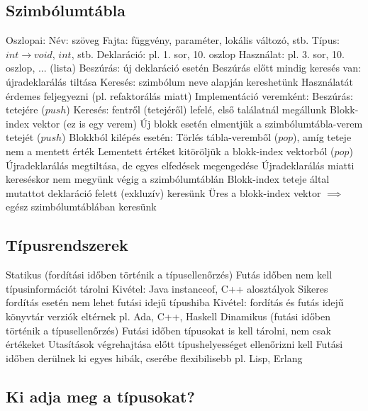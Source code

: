 \documentclass[12pt,a4paper]{article}
\begin{document}
\pagebreak

\subsection{Szimbólumtábla}

\begin{outline}
	\1 Oszlopai:
		\2 Név: szöveg
		\2 Fajta: függvény, paraméter, lokális változó, stb.
		\2 Típus: $int \to void$, $int$, stb.
		\2 Deklaráció: pl. 1. sor, 10. oszlop
		\2 Használat: pl. 3. sor,  10. oszlop, ... (lista)
	\1 Beszúrás: új deklaráció esetén
		\2 Beszúrás előtt mindig keresés van: újradeklarálás tiltása
	\1 Keresés: szimbólum neve alapján kereshetünk
		\2 Használatát érdemes feljegyezni (pl. refaktorálás miatt)
	\1 Implementáció veremként:
		\2 Beszúrás: tetejére ($push$)
		\2 Keresés: fentről (tetejéről) lefelé, első találatnál megállunk
	\1 Blokk-index vektor (ez is egy verem)
		\2 Új blokk esetén elmentjük a szimbólumtábla-verem tetejét ($push$)
		\2 Blokkból kilépés esetén:
			\3 Törlés tábla-veremből ($pop$), amíg teteje nem a mentett érték
			\3 Lementett értéket kitöröljük a blokk-index vektorból ($pop$)
	\1 Újradeklarálás megtiltása, de egyes elfedések megengedése
		\2 Újradeklarálás miatti kereséskor nem megyünk végig a szimbólumtáblán
		\2 Blokk-index teteje által mutattot deklaráció felett (exkluzív) keresünk
		\2 Üres a blokk-index vektor $\implies$ egész szimbólumtáblában keresünk
\end{outline}

\pagebreak

\subsection{Típusrendszerek}

\begin{outline}
	\1 Statikus (fordítási időben történik a típusellenőrzés)
		\2 Futás időben nem kell típusinformációt tárolni
			\3 Kivétel: Java instanceof, C++ alosztályok
		\2 Sikeres fordítás esetén nem lehet futási idejű típushiba
			\3 Kivétel: fordítás és futás idejű könyvtár verziók eltérnek
		\2 pl. Ada, C++, Haskell
	\1 Dinamikus (futási időben történik a típusellenőrzés)
		\2 Futási időben típusokat is kell tárolni, nem csak értékeket
		\2 Utasítások végrehajtása előtt típushelyességet ellenőrizni kell
		\2 Futási időben derülnek ki egyes hibák, cserébe flexibilisebb
		\2 pl. Lisp, Erlang
\end{outline}

\subsection{Ki adja meg a típusokat?}
\end{document}
